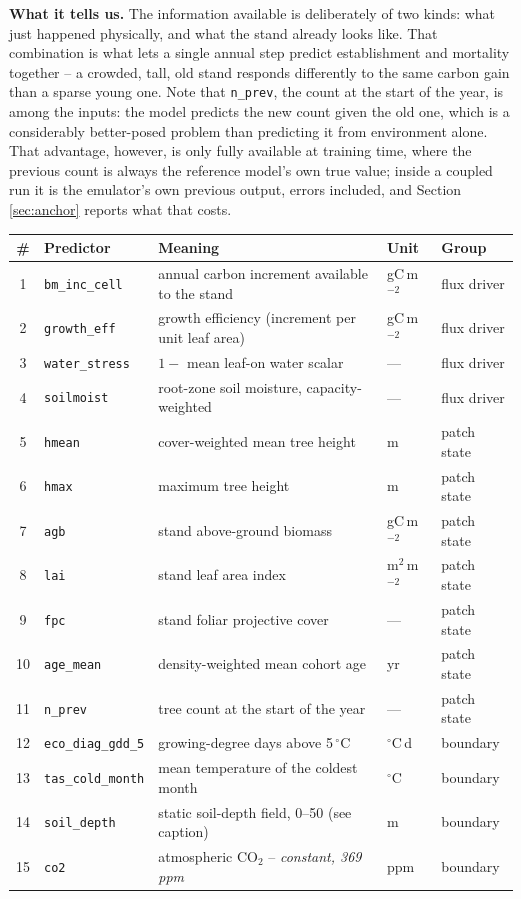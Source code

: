 \documentclass[11pt]{article}
\begin{document}
\begin{table}[h]
{\textbf{What it tells us.} The information available is deliberately of two kinds: what just happened physically, and what the stand already looks like. That combination is what lets a single annual step predict establishment and mortality together -- a crowded, tall, old stand responds differently to the same carbon gain than a sparse young one. Note that \texttt{n\_prev}, the count at the start of the year, is among the inputs: the model predicts the new count given the old one, which is a considerably better-posed problem than predicting it from environment alone. That advantage, however, is only fully available at training time, where the previous count is always the reference model's own true value; inside a coupled run it is the emulator's own previous output, errors included, and Section \ref{sec:anchor} reports what that costs.}
\label{tab:count_inputs}
\small
\begin{tabular}{cllll}
\toprule
\# & Predictor & Meaning & Unit & Group \\
\midrule
1 & \texttt{bm\_inc\_cell} & annual carbon increment available to the stand & gC\,m$^{-2}$ & flux driver \\
2 & \texttt{growth\_eff} & growth efficiency (increment per unit leaf area) & gC\,m$^{-2}$ & flux driver \\
3 & \texttt{water\_stress} & $1 -$ mean leaf-on water scalar & --- & flux driver \\
4 & \texttt{soilmoist} & root-zone soil moisture, capacity-weighted & --- & flux driver \\
\midrule
5 & \texttt{hmean} & cover-weighted mean tree height & m & patch state \\
6 & \texttt{hmax} & maximum tree height & m & patch state \\
7 & \texttt{agb} & stand above-ground biomass & gC\,m$^{-2}$ & patch state \\
8 & \texttt{lai} & stand leaf area index & m$^2$\,m$^{-2}$ & patch state \\
9 & \texttt{fpc} & stand foliar projective cover & --- & patch state \\
10 & \texttt{age\_mean} & density-weighted mean cohort age & yr & patch state \\
11 & \texttt{n\_prev} & tree count at the start of the year & --- & patch state \\
\midrule
12 & \texttt{eco\_diag\_gdd\_5} & growing-degree days above 5\,$^\circ$C & $^\circ$C\,d & boundary \\
13 & \texttt{tas\_cold\_month} & mean temperature of the coldest month & $^\circ$C & boundary \\
14 & \texttt{soil\_depth} & static soil-depth field, 0--50 (see caption) & m & boundary \\
15 & \texttt{co2} & atmospheric CO$_2$ -- \emph{constant, 369\,ppm} & ppm & boundary \\
\bottomrule
\end{tabular}
\end{table}
\end{document}
